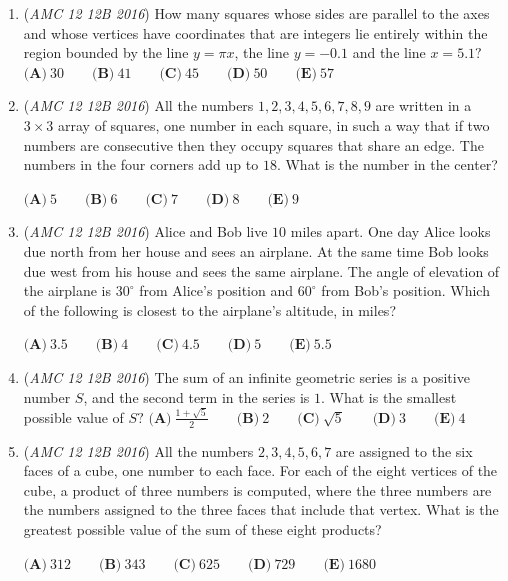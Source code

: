 \begin{enumerate}
	\item (\textit{AMC 12 12B 2016}) How many squares whose sides are parallel to the axes and whose vertices have coordinates that are integers lie entirely within the region bounded by the line $y=\pi x$, the line $y=-0.1$ and the line $x=5.1?$
$\textbf{(A)}\ 30 \qquad \textbf{(B)}\ 41 \qquad \textbf{(C)}\ 45 \qquad \textbf{(D)}\ 50 \qquad \textbf{(E)}\ 57$


	\item (\textit{AMC 12 12B 2016}) All the numbers $1, 2, 3, 4, 5, 6, 7, 8, 9$ are written in a $3\times3$ array of squares, one number in each square, in such a way that if two numbers are consecutive then they occupy squares that share an edge. The numbers in the four corners add up to $18$. What is the number in the center?


 $\textbf{(A)}\ 5\qquad\textbf{(B)}\ 6\qquad\textbf{(C)}\ 7\qquad\textbf{(D)}\ 8\qquad\textbf{(E)}\ 9$


	\item (\textit{AMC 12 12B 2016}) Alice and Bob live $10$ miles apart. One day Alice looks due north from her house and sees an airplane. At the same time Bob looks due west from his house and sees the same airplane. The angle of elevation of the airplane is $30^\circ$ from Alice's position and $60^\circ$ from Bob's position. Which of the following is closest to the airplane's altitude, in miles?


 $\textbf{(A)}\ 3.5 \qquad\textbf{(B)}\ 4 \qquad\textbf{(C)}\ 4.5 \qquad\textbf{(D)}\ 5 \qquad\textbf{(E)}\ 5.5$


	\item (\textit{AMC 12 12B 2016}) The sum of an infinite geometric series is a positive number $S$, and the second term in the series is $1$. What is the smallest possible value of $S?$
$\textbf{(A)}\ \frac{1+\sqrt{5}}{2} \qquad \textbf{(B)}\ 2 \qquad \textbf{(C)}\ \sqrt{5} \qquad \textbf{(D)}\ 3 \qquad \textbf{(E)}\ 4$


	\item (\textit{AMC 12 12B 2016}) All the numbers $2, 3, 4, 5, 6, 7$ are assigned to the six faces of a cube, one number to each face. For each of the eight vertices of the cube, a product of three numbers is computed, where the three numbers are the numbers assigned to the three faces that include that vertex. What is the greatest possible value of the sum of these eight products?


 $\textbf{(A)}\ 312 \qquad \textbf{(B)}\ 343 \qquad \textbf{(C)}\ 625 \qquad \textbf{(D)}\ 729 \qquad \textbf{(E)}\ 1680$



\end{enumerate}
